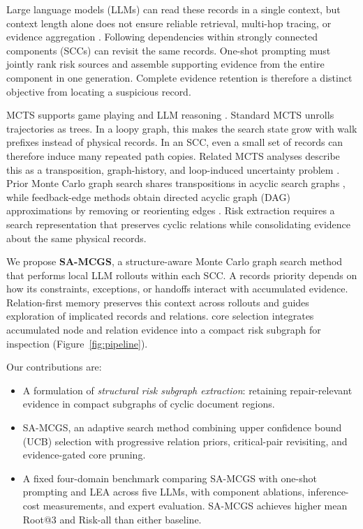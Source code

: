 \documentclass[11pt]{article}
\makeatletter
\newcommand{\samcgs}{SA-MCGS}
\newcommand{\riskall}{Risk-all}
\newcommand{\rootthree}{Root@3}
\newcommand{\scc}{SCC}
\makeatother
\begin{document}
Large language models (LLMs) can read these records in a single context, but context length alone does not ensure reliable retrieval, multi-hop tracing, or evidence aggregation \citep{liu2024lost,hsieh2024ruler,bai2024longbench}. Following dependencies within strongly connected components (\scc{}s) can revisit the same records. One-shot prompting must jointly rank risk sources and assemble supporting evidence from the entire component in one generation. Complete evidence retention is therefore a distinct objective from locating a suspicious record.

MCTS supports game playing \citep{silver2016mastering} and LLM reasoning \citep{zhou2024lats,song2025rekgmcts}.  Standard MCTS unrolls trajectories as trees.  In a loopy graph, this makes the search state grow with
walk prefixes instead of physical records.  In an \scc{}, even a
small set of records can therefore induce many repeated path copies. Related MCTS analyses describe this as a transposition, graph-history, and loop-induced uncertainty
problem \citep{childs2008transpositions,kishimoto2004general,saffidine2012ucd,moerland2020mcts}.
Prior Monte Carlo graph search shares transpositions in acyclic search graphs \citep{czech2021monte}, while feedback-edge methods obtain directed acyclic graph (DAG) approximations by removing or reorienting edges \citep{eades1993fast,berger1990approximation}. Risk extraction requires a search representation that preserves cyclic relations while consolidating evidence about the same physical records.

We propose \textbf{\samcgs{}}, a structure-aware Monte Carlo graph search method that performs local LLM rollouts within each \scc{}. A record\textquotesingle{}s priority depends on how its constraints, exceptions, or handoffs interact with accumulated evidence. Relation-first memory preserves this context across rollouts and guides exploration of implicated records and relations.  core selection integrates accumulated node and relation evidence into a compact risk subgraph for inspection (Figure~\ref{fig:pipeline}).

Our contributions are:
\begin{itemize}[leftmargin=*,itemsep=2pt]
    \item A formulation of \emph{structural risk subgraph extraction}: retaining repair-relevant evidence in compact subgraphs of cyclic document regions.
    \item \samcgs{}, an adaptive search method combining upper confidence bound (UCB) selection with progressive relation priors, critical-pair revisiting, and evidence-gated core pruning.
    \item A fixed four-domain benchmark comparing \samcgs{} with one-shot prompting and LEA across five LLMs, with component ablations, inference-cost measurements, and expert evaluation. \samcgs{} achieves higher mean \rootthree{} and \riskall{} than either baseline.
\end{itemize}
\end{document}
